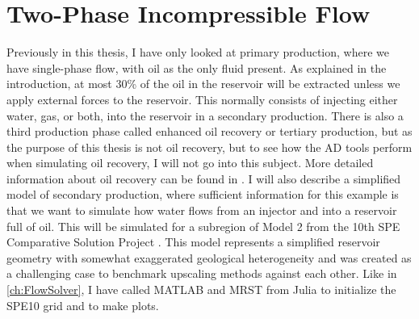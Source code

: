 \section{Two-Phase Incompressible Flow}
\label{sec:TwoPhaseSimulation}
Previously in this thesis, I have only looked at primary production, where we have single-phase flow, with oil as the only fluid present. As explained in the introduction, at most 30\% of the oil in the reservoir will be extracted unless we apply external forces to the reservoir. This normally consists of injecting either water, gas, or both, into the reservoir in a secondary production. There is also a third production phase called enhanced oil recovery or tertiary production, but as the purpose of this thesis is not oil recovery, but to see how the AD tools perform when simulating oil recovery, I will not go into this subject. More detailed information about oil recovery can be found in \citet{lieMrstUrl}. I will also describe a simplified model of secondary production, where sufficient information for this example is that we want to simulate how water flows from an injector and into a reservoir full of oil. This will be simulated for a subregion of Model 2 from the 10th SPE Comparative Solution Project \emph{\citep{SPE10}}. This model represents a simplified reservoir geometry with somewhat exaggerated geological heterogeneity and was created as a challenging case to benchmark upscaling methods against each other. Like in \autoref{ch:FlowSolver}, I have called MATLAB and MRST from Julia to initialize the SPE10 grid and to make plots.

